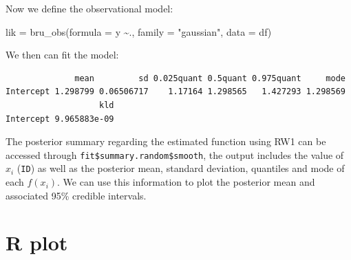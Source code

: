 \documentclass[
  letterpaper,
  DIV=11,
  numbers=noendperiod]{scrartcl}
\newenvironment{Shaded}{\begin{snugshade}}{\end{snugshade}}
\newcommand{\AttributeTok}[1]{\textcolor[rgb]{0.40,0.45,0.13}{#1}}
\newcommand{\FunctionTok}[1]{\textcolor[rgb]{0.28,0.35,0.67}{#1}}
\newcommand{\NormalTok}[1]{\textcolor[rgb]{0.00,0.23,0.31}{#1}}
\newcommand{\OtherTok}[1]{\textcolor[rgb]{0.00,0.23,0.31}{#1}}
\newcommand{\SpecialCharTok}[1]{\textcolor[rgb]{0.37,0.37,0.37}{#1}}
\newcommand{\StringTok}[1]{\textcolor[rgb]{0.13,0.47,0.30}{#1}}
\begin{document}
Now we define the observational model:

\begin{Shaded}
\begin{Highlighting}[]
\NormalTok{lik }\OtherTok{=}  \FunctionTok{bru\_obs}\NormalTok{(}\AttributeTok{formula =}\NormalTok{ y }\SpecialCharTok{\textasciitilde{}}\NormalTok{.,}
            \AttributeTok{family =} \StringTok{"gaussian"}\NormalTok{,}
            \AttributeTok{data =}\NormalTok{ df)}
\end{Highlighting}
\end{Shaded}

We then can fit the model:

\begin{Shaded}
\end{Shaded}

\begin{verbatim}
              mean         sd 0.025quant 0.5quant 0.975quant     mode
Intercept 1.298799 0.06506717    1.17164 1.298565   1.427293 1.298569
                   kld
Intercept 9.965883e-09
\end{verbatim}

The posterior summary regarding the estimated function using RW1 can be
accessed through \texttt{fit\$summary.random\$smooth}, the output
includes the value of \(x_i\) (\texttt{ID}) as well as the posterior
mean, standard deviation, quantiles and mode of each \(f(x_i)\). We can
use this information to plot the posterior mean and associated 95\%
credible intervals.

\section{R plot}
\end{document}
